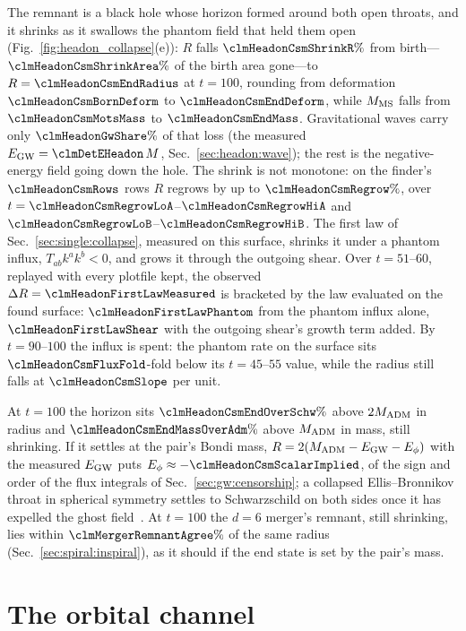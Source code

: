 \documentclass[twocolumn,floatfix,aps,prd,superscriptaddress,nofootinbib]{revtex4-2}
\begin{document}
The remnant is a black hole whose horizon formed around both open throats, and it shrinks as it swallows the phantom field that held them open (Fig.~\ref{fig:headon_collapse}(e)): $R$ falls $\clmHeadonCsmShrinkR\%$ from birth---$\clmHeadonCsmShrinkArea\%$ of the birth area gone---to $R=\clmHeadonCsmEndRadius$ at $t=100$, rounding from deformation $\clmHeadonCsmBornDeform$ to $\clmHeadonCsmEndDeform$, while $M_{\rm MS}$ falls from $\clmHeadonCsmMotsMass$ to $\clmHeadonCsmEndMass$. Gravitational waves carry only $\clmHeadonGwShare\%$ of that loss (the measured $E_{\rm GW}=\clmDetEHeadon\,M$, Sec.~\ref{sec:headon:wave}); the rest is the negative-energy field going down the hole. The shrink is not monotone: on the finder's $\clmHeadonCsmRows$ rows $R$ regrows by up to $\clmHeadonCsmRegrow\%$, over $t=\clmHeadonCsmRegrowLoA$--$\clmHeadonCsmRegrowHiA$ and $\clmHeadonCsmRegrowLoB$--$\clmHeadonCsmRegrowHiB$. The first law of Sec.~\ref{sec:single:collapse}, measured on this surface, shrinks it under a phantom influx, $T_{ab}k^ak^b<0$, and grows it through the outgoing shear. Over $t=51$--$60$, replayed with every plotfile kept, the observed $\Delta R=\clmHeadonFirstLawMeasured$ is bracketed by the law evaluated on the found surface: $\clmHeadonFirstLawPhantom$ from the phantom influx alone, $\clmHeadonFirstLawShear$ with the outgoing shear's growth term added. By $t=90$--$100$ the influx is spent: the phantom rate on the surface sits $\clmHeadonCsmFluxFold$-fold below its $t=45$--$55$ value, while the radius still falls at $\clmHeadonCsmSlope$ per unit.

At $t=100$ the horizon sits $\clmHeadonCsmEndOverSchw\%$ above $2M_{\rm ADM}$ in radius and $\clmHeadonCsmEndMassOverAdm\%$ above $M_{\rm ADM}$ in mass, still shrinking. If it settles at the pair's Bondi mass, $R=2(M_{\rm ADM}-E_{\rm GW}-E_\phi)$ with the measured $E_{\rm GW}$ puts $E_\phi\approx-\clmHeadonCsmScalarImplied$, of the sign and order of the flux integrals of Sec.~\ref{sec:gw:censorship}; a collapsed Ellis--Bronnikov throat in spherical symmetry settles to Schwarzschild on both sides once it has expelled the ghost field~\cite{kain2026}. At $t=100$ the $d=6$ merger's remnant, still shrinking, lies within $\clmMergerRemnantAgree\%$ of the same radius (Sec.~\ref{sec:spiral:inspiral}), as it should if the end state is set by the pair's mass.

\section{The orbital channel}
\label{sec:spiral}
\end{document}

